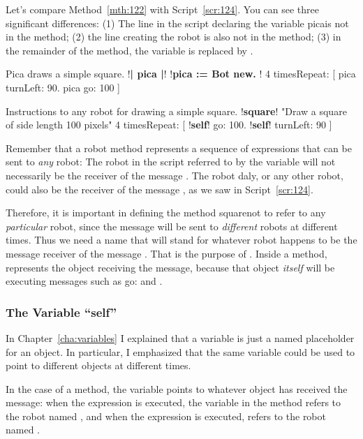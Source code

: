 \documentclass[a4paper,10pt,twoside]{book}
\begin{document}
Let’s compare Method~\ref{mth:122} with Script~\ref{scr:124}. You can see three significant differences: (1) The line 
in the script declaring the variable picais not in the method; (2) the line creating the robot is also 
not in the method; (3) in the remainder of the method, the variable  is replaced by . 

\begin{script}[124]{Pica draws a simple square.} 
!\textbf{| pica |}!
!\textbf{pica := Bot new. }!
4 timesRepeat: 
	[ pica turnLeft: 90. 
	pica go: 100 ] 
\end{script} 


\begin{method}[122]{Instructions to any robot for drawing a simple square.}
!\textbf{square}! 
"Draw a square of side length 100 pixels" 
4 timesRepeat: 
	[ !\textbf{self}! go: 100. 
	!\textbf{self}! turnLeft: 90 ]
\end{method}

Remember that a robot method represents a sequence of expressions that can be sent to 
\emph{any} robot: The robot in the script referred to by the variable  will not necessarily be the 
receiver of the message . The robot daly, or any other robot, could also be the receiver 
of the message , as we saw in Script~\ref{scr:124}.

Therefore, it is important in defining the method squarenot to refer to any \emph{particular} 
robot, since the message  will be sent to \emph{different} robots at different times. Thus we 
need a name that will stand for whatever robot happens to be the message receiver of the 
message . That is the purpose of . Inside a method,  represents the object 
receiving the message, because that object \emph{itself} will be executing messages such as go: 
and .

\subsubsection{The Variable ``self''} 

In Chapter~\ref{cha:variables} I explained that a variable is just a named placeholder for an object. In particular, 
I emphasized that the same variable could be used to point to different objects at different 
times. 

In the case of a method, the variable  points to whatever object has received the 
message: when the expression  is executed, the variable  in the method 
 refers to the robot named , and when the expression  is executed, 
 refers to the robot named . 
\end{document}
